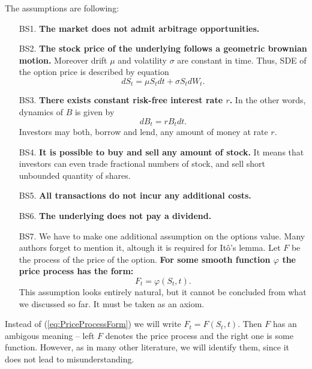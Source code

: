 \documentclass[a4paper,11pt, twoside]{book}
\theoremstyle{definition}
\theoremstyle{remark}
\begin{document}
The assumptions are following:
\begin{enumerate}
  \item[BS1.] \textbf{The market does not admit arbitrage opportunities.}

 \item[BS2.] \textbf{The stock price of the underlying follows a geometric brownian motion.} Moreover drift $\mu$ and volatility $\sigma$ are constant in time. Thus, SDE of the option price is described by equation
\begin{equation}
 \label{eq:BS_dynamics}
 dS_t = \mu S_t dt + \sigma S_t dW_t. 
\end{equation}
 
  \item[BS3.] \textbf{There exists constant risk-free interest rate $r$.} In the other words, dynamics of $B$ is given by 
\[ dB_t = rB_t dt. \]
Investors may both, borrow and lend, any amount of money at rate $r$.

  \item[BS4.] \textbf{It is possible to buy and sell any amount of stock.} It means that investors can even trade fractional numbers of stock, and sell short unbounded quantity of shares.

  \item[BS5.] \textbf{All transactions do not incur any additional costs.}

  \item[BS6.] \textbf{The underlying does not pay a dividend.}
  
  \item[BS7.] We have to make one additional assumption on the options value. Many authors forget to mention it, altough it is required for It\^{o}'s lemma. Let $F$ be the process of the price of the option\footnotemark.
  \textbf{For some smooth function $\varphi$ the price process has the form:}
    \begin{equation}
    \label{eq:PriceProcessForm}
    F_t = \varphi(S_t, t).
    \end{equation}
This assumption looks entirely natural, but it cannot be concluded from what we discussed so far. It must be taken as an axiom.
\end{enumerate}

Instead of (\ref{eq:PriceProcessForm}) we will write $F_t = F(S_t, t)$. Then $F$ has an ambigous meaning -- left $F$ denotes the price process and the right one is some function. However, as in many other literature, we will identify them, since it does not lead to misunderstanding.
\end{document}
